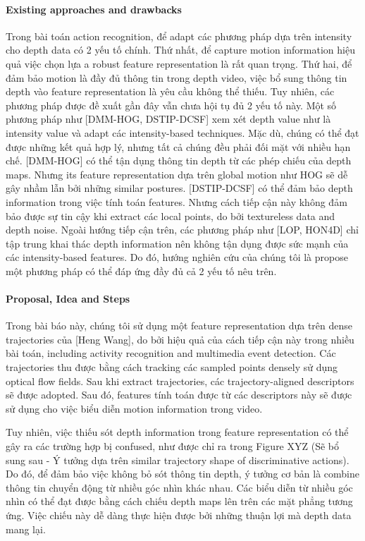 \documentclass[review]{elsarticle}
\begin{document}
\paragraph{Existing approaches and drawbacks} Trong bài toán action recognition, để adapt các phương pháp dựa trên intensity cho depth data có 2 yếu tố chính. Thứ nhất, để capture motion information hiệu quả việc chọn lựa a robust feature representation là rất quan trọng. Thứ hai, để đảm bảo motion là đầy đủ thông tin trong depth video, việc bổ sung thông tin depth vào feature representation là yêu cầu không thể thiếu. Tuy nhiên, các phương pháp được đề xuất gần đây vẫn chưa hội tụ đủ 2 yếu tố này. Một số phương pháp như [DMM-HOG, DSTIP-DCSF] xem xét depth value như là intensity value và adapt các intensity-based techniques. Mặc dù, chúng có thể đạt được những kết quả hợp lý, nhưng tất cả chúng đều phải đối mặt với nhiều hạn chế. [DMM-HOG] có thể tận dụng thông tin depth từ các phép chiếu của depth maps. Nhưng its feature representation dựa trên global motion như HOG sẽ dễ gây nhầm lẫn bởi những similar postures. [DSTIP-DCSF] có thể đảm bảo depth information trong việc tính toán features. Nhưng cách tiếp cận này không đảm bảo được sự tin cậy khi extract các local points, do bởi textureless data and depth noise. Ngoài hướng tiếp cận trên, các phương pháp như [LOP, HON4D] chỉ tập trung khai thác depth information nên không tận dụng được sức mạnh của các intensity-based features. Do đó, hướng nghiên cứu của chúng tôi là propose một phương pháp có thể đáp ứng đầy đủ cả 2 yếu tố nêu trên.

\paragraph{Proposal, Idea and Steps}Trong bài báo này, chúng tôi sử dụng một feature representation dựa trên dense trajectories của [Heng Wang], do bởi hiệu quả của cách tiếp cận này trong nhiều bài toán, including activity recognition and multimedia event detection. Các trajectories thu được bằng cách tracking các sampled points densely sử dụng optical flow fields. Sau khi extract trajectories, các trajectory-aligned descriptors sẽ được adopted. Sau đó, features tính toán được từ các descriptors này sẽ được sử dụng cho việc biểu diễn motion information trong video.

Tuy nhiên, việc thiếu sót depth information trong feature representation có thể gây ra các trường hợp bị confused, như được chỉ ra trong Figure XYZ (Sẽ bổ sung sau - Ý tưởng dựa trên similar trajectory shape of discriminative actions). Do đó, để đảm bảo việc không bỏ sót thông tin depth, ý tưởng cơ bản là combine thông tin chuyển động từ nhiều góc nhìn khác nhau. Các biểu diễn từ nhiều góc nhìn có thể đạt được bằng cách chiếu depth maps lên trên các mặt phẳng tương ứng. Việc chiếu này dễ dàng thực hiện được bởi những thuận lợi mà depth data mang lại.
\end{document}
